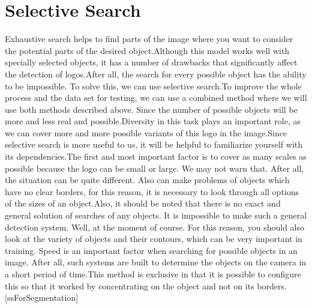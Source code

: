 \section{Selective Search}\label{sec:3.3}
\vspace{-0.5cm}
\noindent Exhaustive search helps to find parts of the image where you want to consider the potential parts of the desired object.Although this model works well with specially selected objects, it has a number of drawbacks that significantly affect the detection of logos.After all, the search for every possible object has the ability to be impossible. To solve this, we can use selective search.To improve the whole process and the data set for testing, we can use a combined method where we will use both methods described above. Since the number of possible objects will be more and less real and possible.Diversity in this task plays an important role, as we can cover more and more possible variants of this logo in the image.Since selective search is more useful to us, it will be helpful to familiarize yourself with its dependencies.The first and most important factor is to cover as many scales as possible because the logo can be small or large. We may not warn that. After all, the situation can be quite different. Also can make problems of objects which have no clear borders, for this reason, it is necessary to look through all options of the sizes of an object.Also, it should be noted that there is no exact and general solution of searches of any objects. It is impossible to make such a general detection system. Well, at the moment of course. For this reason, you should also look at the variety of objects and their contours, which can be very important in training. Speed is an important factor when searching for possible objects in an image. After all, such systems are built to determine the objects on the camera in a short period of time.This method is exclusive in that it is possible to configure this so that it worked by concentrating on the object and not on its borders.[ssForSegmentation]

